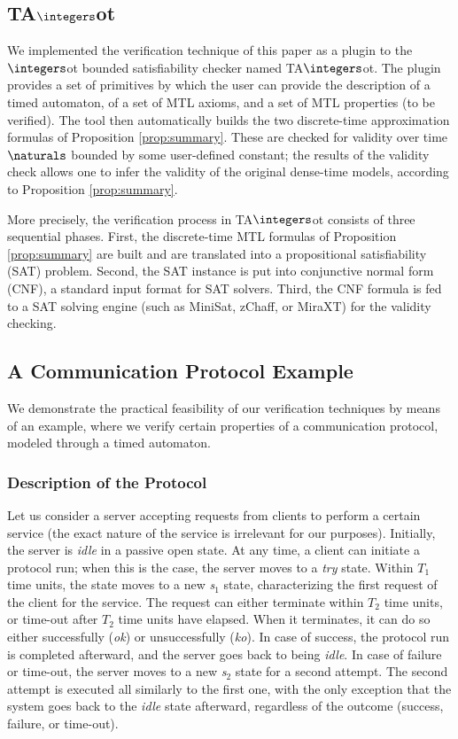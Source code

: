 \documentclass[a4paper]{article}
\newcommand{\zot}{$\integers$ot}
\newcommand{\tazot}{\textsf{TA}$\integers$ot}
\theoremstyle{plain}
\theoremstyle{definition}
\begin{document}
\subsection{\tazot{}}
We implemented the verification technique of this paper as a plugin to the \zot{} bounded satisfiability checker \cite{zot,PMS07} named \tazot{}.
The plugin provides a set of primitives by which the user can provide the description of a timed automaton, of a set of MTL axioms, and a set of MTL properties (to be verified).
The tool then automatically builds the two discrete-time approximation formulas of Proposition \ref{prop:summary}.
These are checked for validity over time $\naturals$ bounded by some user-defined constant; the results of the validity check allows one to infer the validity of the original dense-time models, according to Proposition \ref{prop:summary}.

More precisely, the verification process in \tazot{} consists of three sequential phases.
First, the discrete-time MTL formulas of Proposition \ref{prop:summary} are built and are translated into a propositional satisfiability (SAT) problem.
Second, the SAT instance is put into conjunctive normal form (CNF), a standard input format for SAT solvers.
Third, the CNF formula is fed to a SAT solving engine (such as MiniSat, zChaff, or MiraXT) for the validity checking.






\subsection{A Communication Protocol Example}
We demonstrate the practical feasibility of our verification techniques by means of an example, where we verify certain properties of a communication protocol, modeled through a timed automaton.

\subsubsection{Description of the Protocol}
Let us consider a server accepting requests from clients to perform a certain service (the exact nature of the service is irrelevant for our purposes).
Initially, the server is \emph{idle} in a passive open state.
At any time, a client can initiate a protocol run; when this is the case, the server moves to a \emph{try} state.
Within $T_1$ time units, the state moves to a new \emph{s$_1$} state, characterizing the first request of the client for the service.
The request can either terminate within $T_2$ time units, or time-out after $T_2$ time units have elapsed.
When it terminates, it can do so either successfully (\emph{ok}) or unsuccessfully (\emph{ko}).
In case of success, the protocol run is completed afterward, and the server goes back to being \emph{idle}.
In case of failure or time-out, the server moves to a new \emph{s$_2$} state for a second attempt.
The second attempt is executed all similarly to the first one, with the only exception that the system goes back to the \emph{idle} state afterward, regardless of the outcome (success, failure, or time-out).
\end{document}
